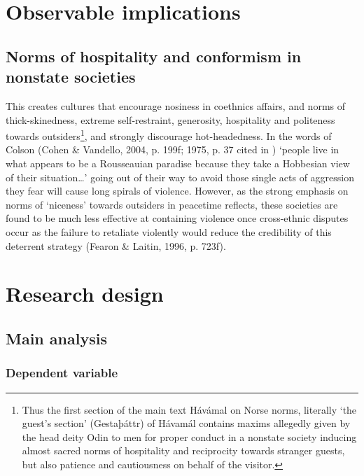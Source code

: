 \documentclass[12pt]{article}
\begin{document}
\section{Observable implications}


\subsection{Norms of hospitality and conformism in nonstate societies}

This creates cultures that encourage nosiness in coethnics affairs, and norms of
thick-skinedness, extreme self-restraint, generosity, hospitality and politeness
towards outsiders\footnote{Thus the first section of the main text Hávámal on
	Norse norms, literally ‘the guest’s section’ (Gestaþáttr) of Hávamál
	contains maxims allegedly given by the head deity Odin to men for proper
	conduct in a nonstate society inducing almost sacred norms of
	hospitality and reciprocity towards stranger guests, but also patience
and cautiousness on behalf of the visitor.}, and strongly discourage
hot-headedness. In the words of Colson (Cohen \& Vandello, 2004, p. 199f; 1975,
p. 37 cited in ) ‘people live in what appears to be a Rousseauian paradise
because they take a Hobbesian view of their situation…’ going out of their way
to avoid those single acts of aggression they fear will cause long spirals of
violence. However, as the strong emphasis on norms of ‘niceness’ towards
outsiders in peacetime reflects, these societies are found to be much less
effective at containing violence once cross-ethnic disputes occur as the failure
to retaliate violently would reduce the credibility of this deterrent strategy
(Fearon \& Laitin, 1996, p. 723f).

\section{Research design}
\subsection{Main analysis}

\subsubsection{Dependent variable}
\end{document}
